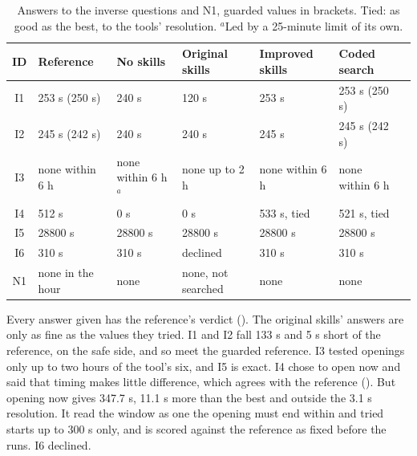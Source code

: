   \begin{table}[H]
    \centering
    \small
    \setlength{\tabcolsep}{4pt}
    \begin{tabular}{@{}cllllll@{}}
      \toprule
      \textbf{ID} & \textbf{Reference} & \textbf{No skills} & \textbf{Original skills}
        & \textbf{Improved skills} & \textbf{Coded search} \\
      \midrule
      I1 & 253 s (250 s)    & 240 s                   & 120 s              & 253 s            & 253 s (250 s) \\
      I2 & 245 s (242 s)    & 240 s                   & 240 s              & 245 s            & 245 s (242 s) \\
      I3 & none within 6 h  & none within 6 h$^{a}$   & none up to 2 h     & none within 6 h  & none within 6 h \\
      I4 & 512 s            & 0 s                     & 0 s                & 533 s, tied      & 521 s, tied \\
      I5 & 28800 s          & 28800 s                 & 28800 s            & 28800 s          & 28800 s \\
      I6 & 310 s            & 310 s                   & declined           & 310 s            & 310 s \\
      N1 & none in the hour & none                    & none, not searched & none             & none \\
      \bottomrule
    \end{tabular}
    \caption{Answers to the inverse questions and N1, guarded values in brackets. Tied: as good as
    the best, to the tools' resolution. $^{a}$Led by a 25-minute limit of its own.}
    \label{tab:results-closeness}
  \end{table}

  Every answer given has the reference's verdict (). The original
  skills' answers are only as fine as the values they tried. I1 and I2 fall 133 s and 5 s short
  of the reference, on the safe side, and so meet the guarded reference. I3 tested openings only up
  to two hours of the tool's six, and I5 is exact. I4 chose to open now and said that timing makes
  little difference, which agrees with the reference (). But opening now gives 347.7 s, 11.1 s more than the best and outside
  the 3.1 s resolution. It read the window as one the opening must end within and tried starts up
  to 300 s only, and is scored against the reference as fixed before the runs. I6 declined.

